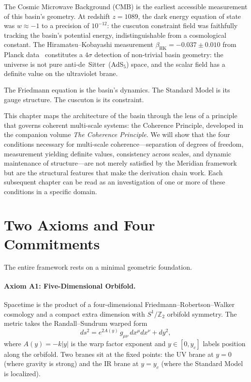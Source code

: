 The Cosmic Microwave Background (CMB) is the earliest accessible
measurement of this basin's geometry. At redshift $z = 1089$, the
dark energy equation of state was $w \approx -1$ to a precision of
$10^{-12}$: the cuscuton constraint field was faithfully tracking the
basin's potential energy, indistinguishable from a cosmological
constant. The Hiramatsu--Kobayashi measurement
$\beta_{\mathrm{HK}} = -0.037 \pm 0.010$ from Planck
data~\cite{ch2:Hiramatsu2022} constitutes a $4\sigma$ detection of
non-trivial basin geometry: the universe is not pure
anti-de~Sitter~(AdS$_5$) space, and the scalar field has a definite
value on the ultraviolet brane.

The Friedmann equation is the basin's dynamics. The Standard Model is
its gauge structure. The cuscuton is its constraint.

This chapter maps the architecture of the basin through the lens of a
principle that governs coherent multi-scale systems: the Coherence
Principle, developed in the companion volume \textit{The Coherence
Principle}. We will show that the four conditions necessary for
multi-scale coherence---separation of degrees of freedom, measurement
yielding definite values, consistency across scales, and dynamic
maintenance of structure---are not merely satisfied by the Meridian
framework but are the structural features that make the derivation
chain work. Each subsequent chapter can be read as an investigation of
one or more of these conditions in a specific domain.

\section{Two Axioms and Four Commitments}
\label{sec:0-axioms}

The entire framework rests on a minimal geometric foundation.

\paragraph{Axiom A1: Five-Dimensional Orbifold.}
Spacetime is the product of a four-dimensional Friedmann--Robertson--Walker
cosmology and a compact extra dimension with $S^1/\mathbb{Z}_2$ orbifold
symmetry. The metric takes the Randall--Sundrum warped
form~\cite{ch1:rs1,ch1:rs2}
\begin{equation}
\label{eq:0-metric}
ds^2 = e^{2A(y)}\, g_{\mu\nu}\, dx^\mu dx^\nu + dy^2,
\end{equation}
where $A(y) = -k|y|$ is the warp factor exponent and $y \in [0, y_c]$
labels position along the orbifold. Two branes sit at the fixed points:
the UV brane at $y = 0$ (where gravity is strong) and the IR brane at
$y = y_c$ (where the Standard Model is localized).

